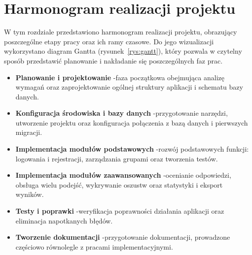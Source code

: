 ﻿\chapter{Harmonogram realizacji projektu}
\label{cha:harmonogram}

W tym rozdziale przedstawiono harmonogram realizacji projektu, obrazujący poszczególne etapy pracy
oraz ich ramy czasowe. Do jego wizualizacji wykorzystano diagram Gantta
(rysunek~\ref{rys:gantt}), który pozwala w czytelny sposób przedstawić planowanie i nakładanie się
poszczególnych faz prac.

\begin{itemize}
  \item \textbf{Planowanie i projektowanie} -faza początkowa obejmująca analizę wymagań oraz
        zaprojektowanie ogólnej struktury aplikacji i schematu bazy danych.
  \item \textbf{Konfiguracja środowiska i bazy danych} -przygotowanie narzędzi, utworzenie
        projektu oraz konfiguracja połączenia z bazą danych i pierwszych migracji.
  \item \textbf{Implementacja modułów podstawowych} -rozwój podstawowych funkcji: logowania
        i rejestracji, zarządzania grupami oraz tworzenia testów.
  \item \textbf{Implementacja modułów zaawansowanych} -ocenianie odpowiedzi, obsługa wielu
        podejść, wykrywanie oszustw oraz statystyki i eksport wyników.
  \item \textbf{Testy i poprawki} -weryfikacja poprawności działania aplikacji oraz eliminacja
        napotkanych błędów.
  \item \textbf{Tworzenie dokumentacji} -przygotowanie dokumentacji, prowadzone częściowo
        równolegle z pracami implementacyjnymi.
\end{itemize}

